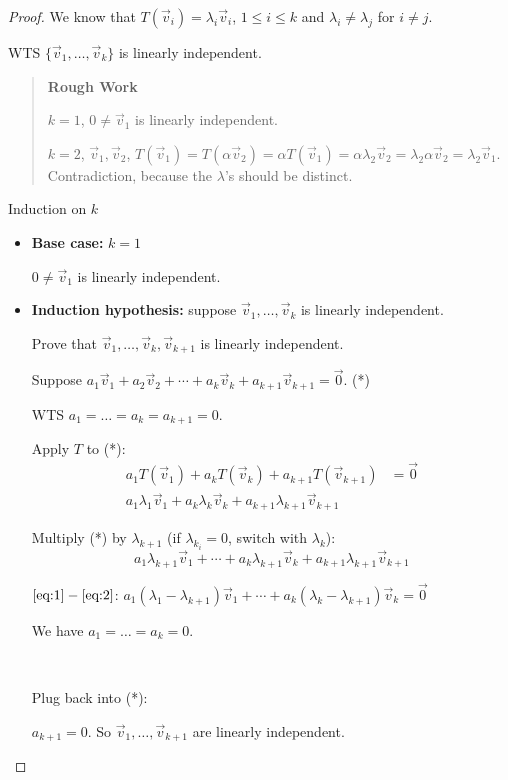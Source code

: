 \documentclass[11pt,fleqn]{book} %
\begin{document}
\begin{proof}
    We know that $T(\vec{v}_i) = \lambda_i\vec{v}_i$, $1 \le i \le k$ and $\lambda_i \neq \lambda_j$ for $i \neq j$.

    WTS $\{ \vec{v}_1, \dots, \vec{v}_k \}$ is linearly independent.

\begin{quotation}
    \textbf{Rough Work}

    $k = 1$, $0 \neq \vec{v}_1$ is linearly independent.

    $k = 2$, $\vec{v}_1, \vec{v}_2$, $T(\vec{v}_1) = T(\alpha\vec{v}_2) = \alpha T(\vec{v}_1) = \alpha\lambda_2 \vec{v}_2 = \lambda_2\alpha\vec{v}_2 = \lambda_2\vec{v}_1$. Contradiction, because the $\lambda$'s should be distinct.
\end{quotation}

    Induction on $k$

    \begin{itemize}
        \item \textbf{Base case:} $k = 1$

        $0 \neq \vec{v}_1$ is linearly independent.

        \item \textbf{Induction hypothesis:} suppose $\vec{v}_1, \dots, \vec{v}_k$ is linearly independent.

        Prove that $\vec{v}_1, \dots, \vec{v}_k, \vec{v}_{k+1}$ is linearly independent.

    Suppose $a_1\vec{v}_1 + a_2\vec{v}_2 + \cdots + a_k\vec{v}_k + a_{k+1}\vec{v}_{k+1} = \vec{0}$. (*)

    WTS $a_1 = \dots = a_k = a_{k+1} = 0$.

    Apply $T$ to (*):
    \begin{align*}
        a_1T(\vec{v}_1) + a_kT(\vec{v}_k) +a_{k+1}T(\vec{v}_{k+1})
        &= \vec{0}
        \\
        a_1\lambda_1\vec{v}_1 +a_k\lambda_k\vec{v}_k +a_{k+1}\lambda_{k+1}\vec{v}_{k+1}
        \label{eq:1}\tag{1}
    \end{align*}

    Multiply (*) by $\lambda_{k+1}$ (if $\lambda_{k_i} = 0$, switch with $\lambda_k$):
    \begin{equation*}
        a_1\lambda_{k+1}\vec{v}_1 + \cdots + a_k\lambda_{k+1}\vec{v}_k + a_{k+1}\lambda_{k+1}\vec{v}_{k+1}
        \label{eq:2}\tag{2}
    \end{equation*}

    $\ref{eq:1} - \ref{eq:2}$:
    $a_1(\lambda_1 - \lambda_{k+1})\vec{v}_1 + \cdots + a_k(\lambda_k-\lambda_{k+1})\vec{v}_k = \vec{0}$

    We have $a_1 = \dots = a_k = 0$.

    {~~~}

    Plug back into (*):

    $a_{k+1} = 0$. So $\vec{v}_1, \dots, \vec{v}_{k+1}$ are linearly independent.
    \end{itemize}
\end{proof}
\end{document}
